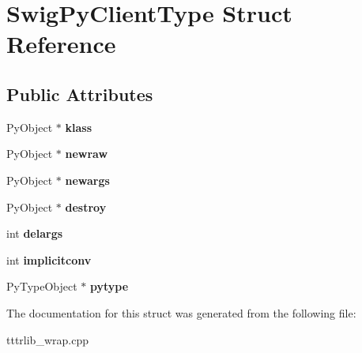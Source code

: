 \hypertarget{struct_swig_py_client_data}{}\section{Swig\+Py\+Client\+Type Struct Reference}
\label{struct_swig_py_client_data}
\subsection*{Public Attributes}
\begin{DoxyCompactItemize}
\item 
\mbox{\label{struct_swig_py_client_data_a482d64908147c310a56d1541476079dc}} 
Py\+Object $\ast$ {\bfseries klass}
\item 
\mbox{\label{struct_swig_py_client_data_a4da9e7723a1319cb42cda4ad186f65a3}} 
Py\+Object $\ast$ {\bfseries newraw}
\item 
\mbox{\label{struct_swig_py_client_data_a8f6dacca2c445f175d622fb9264e3715}} 
Py\+Object $\ast$ {\bfseries newargs}
\item 
\mbox{\label{struct_swig_py_client_data_a1c4e62712f23db599e85e24e14818d59}} 
Py\+Object $\ast$ {\bfseries destroy}
\item 
\mbox{\label{struct_swig_py_client_data_a9cb4b9b02743d09dbe216f304e2b7df0}} 
int {\bfseries delargs}
\item 
\mbox{\label{struct_swig_py_client_data_a5f9ebdbc04a774559a64b926b6ec4070}} 
int {\bfseries implicitconv}
\item 
\mbox{\label{struct_swig_py_client_data_a1f172e51bb27f670dacdf8247843b4c2}} 
Py\+Type\+Object $\ast$ {\bfseries pytype}
\end{DoxyCompactItemize}


The documentation for this struct was generated from the following file\+:\begin{DoxyCompactItemize}
\item 
tttrlib\+\_\+wrap.\+cpp\end{DoxyCompactItemize}
